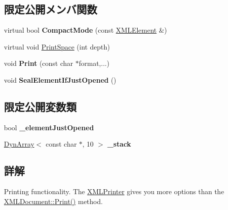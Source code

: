 \subsection*{限定公開メンバ関数}
\begin{DoxyCompactItemize}
\item 
\mbox{\label{classtinyxml2_1_1_x_m_l_printer_a38e1ed5a779bdf63eda9e808f7a6de66}} 
virtual bool {\bfseries Compact\+Mode} (const \hyperlink{classtinyxml2_1_1_x_m_l_element}{X\+M\+L\+Element} \&)
\item 
virtual void \hyperlink{classtinyxml2_1_1_x_m_l_printer_a1c4b2ccbe4fdb316d54f5a93f3559260}{Print\+Space} (int depth)
\item 
\mbox{\label{classtinyxml2_1_1_x_m_l_printer_ab30210a7f32e45634e7a45137bf6fdf6}} 
void {\bfseries Print} (const char $\ast$format,...)
\item 
\mbox{\label{classtinyxml2_1_1_x_m_l_printer_ac6e2c72c5d796f5b4de6ce81ca95e3fa}} 
void {\bfseries Seal\+Element\+If\+Just\+Opened} ()
\end{DoxyCompactItemize}
\subsection*{限定公開変数類}
\begin{DoxyCompactItemize}
\item 
\mbox{\label{classtinyxml2_1_1_x_m_l_printer_ac07169d58b465214a2b1fa306e617c26}} 
bool {\bfseries \+\_\+element\+Just\+Opened}
\item 
\mbox{\label{classtinyxml2_1_1_x_m_l_printer_a99d59e67e084714541bee3ae43884bef}} 
\hyperlink{classtinyxml2_1_1_dyn_array}{Dyn\+Array}$<$ const char $\ast$, 10 $>$ {\bfseries \+\_\+stack}
\end{DoxyCompactItemize}


\subsection{詳解}
Printing functionality. The \hyperlink{classtinyxml2_1_1_x_m_l_printer}{X\+M\+L\+Printer} gives you more options than the \hyperlink{classtinyxml2_1_1_x_m_l_document_a867cf5fa3e3ff6ae4847a8b7ee8ec083}{X\+M\+L\+Document\+::\+Print()} method.

